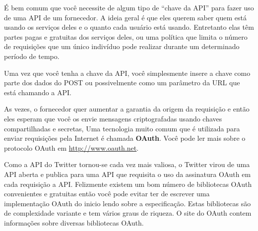 É bem comum que você necessite de algum tipo de 
``chave da API'' para fazer uso de uma API de um fornecedor.
A ideia geral é que eles querem saber quem está usando os
serviços deles e o quanto cada usuário está usando.
Entretanto elas têm partes pagas e gratuitas dos serviços
deles, ou uma política que limita o número de requisições
que um único indivíduo pode realizar durante um determinado
período de tempo.

Uma vez que você tenha a chave da API, você simplesmente
insere a chave como parte dos dados do POST ou possivelmente
como um parâmetro da URL que está chamando a API.

As vezes, o fornecedor quer aumentar a garantia da 
origem da requisição e então eles esperam que você os
envie mensagens criptografadas usando chaves compartilhadas
e secretas, Uma tecnologia muito comum que é utilizada para 
enviar requisições pela Internet é chamada {\bf OAuth}.
Você pode ler mais sobre o protocolo OAuth em 
\url{http://www.oauth.net}.

Como a API do Twitter tornou-se cada vez mais valiosa, o
Twitter virou de uma API aberta e publica para uma API que
requisita o uso da assinatura OAuth em cada requisição a API.
Felizmente existem um bom número de bibliotecas OAuth 
convenientes e gratuitas então você pode evitar ter de escrever
uma implementação OAuth do inicio lendo sobre a especificação.
Estas bibliotecas são de complexidade variante e tem vários
graus de riqueza. O site do OAuth contem informações sobre
diversas bibliotecas OAuth.

